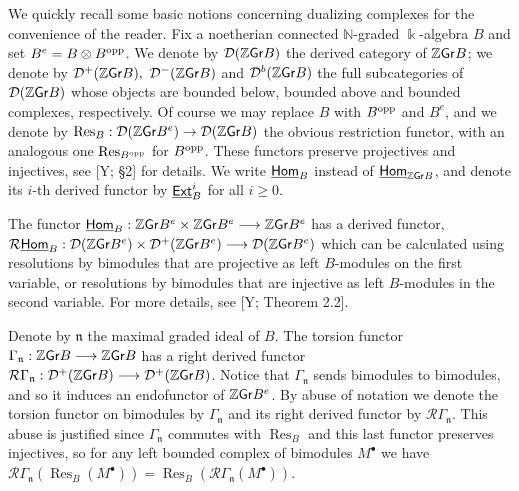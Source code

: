 \documentclass[twoside,11pt]{article}
\renewcommand{\k}{\Bbbk}
\newcommand{\N}{{\mathbb N}}
\newcommand{\Z}{{\mathbb Z}}
\newcommand{\D}{{\mathcal D}}
\newcommand{\R}{{\mathcal R}}
\newcommand{\n}{{\mathfrak n}}
\newcommand{\GrMod}{{\sf Gr}}
\newcommand{\HOM}{\underline{{\sf Hom}}}
\newcommand{\EXT}{\underline{\sf Ext}}
\newcommand{\opp}{{\rm opp}}
\DeclareMathOperator{\Res}{Res}
\begin{document}
We quickly recall some basic notions concerning dualizing complexes for the convenience of
the reader. Fix a noetherian connected $\N$-graded $\k$-algebra $B$ and set $B^e
= B\otimes B^\opp$. We denote by $\D(\Z\GrMod B)$ the derived category of $\Z\GrMod B$;
we denote by $\D^+(\Z\GrMod B),$ $\D^-(\Z\GrMod B)$ and $\D^b(\Z\GrMod B)$ the full
subcategories of $\D(\Z\GrMod B)$ whose objects are bounded below, bounded above
and bounded complexes, respectively. Of course we may replace $B$ with $B^\opp$ and $B^e$,
and we denote by $\Res_B: \D(\Z \GrMod B^e) \to \D(\Z \GrMod B)$ the obvious restriction
functor, with an analogous one $\Res_{B^\opp}$ for $B^\opp$. These functors preserve
projectives and injectives, see [Y; \S 2] for details. We write $\HOM_B$ instead of
$\HOM_{\Z\GrMod B}$, and denote its $i$-th derived functor by $\EXT_B^i$ for all $i \geq
0$.

The functor $\HOM_B: \Z\GrMod B^e \times \Z\GrMod B^e \longrightarrow \Z\GrMod B^e$
has a derived functor, $\R\HOM_B : \D(\Z\GrMod B^e) \times \D^+(\Z\GrMod B^e )
\longrightarrow \D(\Z\GrMod B^e)$ which can be calculated using resolutions by bimodules
that are projective as left $B$-modules on the first variable, or resolutions by bimodules
that are injective as left $B$-modules in the second variable. For more details, see [Y;
Theorem 2.2].

Denote by $\n$ the maximal graded ideal of $B$. The torsion functor $\Gamma_\n
: \Z\GrMod B  \longrightarrow \Z\GrMod B $ has a right derived functor $\R\Gamma_\n :
\D^+(\Z\GrMod B ) \longrightarrow \D^+(\Z\GrMod B )$. Notice that $\Gamma_\n$ sends
bimodules to bimodules, and so it induces an endofunctor of $\Z\GrMod B^e$. By abuse of
notation we denote the torsion functor on bimodules by $\Gamma_\n$ and its right derived
functor by $\R \Gamma_\n$. This abuse is justified since $\Gamma_\n$ commutes with
$\Res_B$ and this last functor preserves injectives, so for any left bounded complex of
bimodules $M^\bullet$ we have $\R\Gamma_\n(\Res_B(M^\bullet)) = \Res_B(\R
\Gamma_\n(M^\bullet))$.
\end{document}
